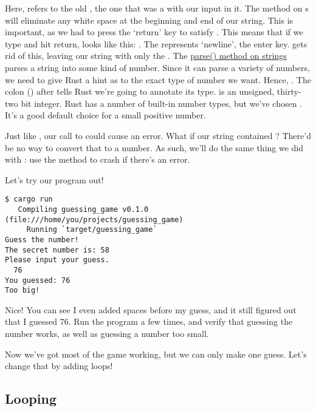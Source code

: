 Here,  refers to the old , the one that was a  with our input in it. The  method 
on s will eliminate any white space at the beginning and end of our string. This is important, as we had to press the
‘return’ key to satisfy . This means that if we type  and hit return,  looks like this: 
. The \code{\\n} represents ‘newline’, the enter key.  gets rid of this, leaving our string with only the 
. The \href{https://doc.rust-lang.org/std/primitive.str.html#method.parse}{parse() method on strings} parses a string into
some kind of number. Since it can parse a variety of numbers, we need to give Rust a hint as to the exact type of number we want.
Hence, . The colon (\code{:}) after  tells Rust we’re going to annotate its type.  is 
an unsigned, thirty-two bit integer. Rust has a number of built-in number types, but we’ve chosen . It’s a good default
choice for a small positive number.

\blank

Just like , our call to  could cause an error. What if our string contained ? 
There’d be no way to convert that to a number. As such, we’ll do the same thing we did with : use the 
 method to crash if there’s an error.

\blank

Let’s try our program out!

\begin{verbatim}
$ cargo run
   Compiling guessing_game v0.1.0 (file:///home/you/projects/guessing_game)
     Running `target/guessing_game`
Guess the number!
The secret number is: 58
Please input your guess.
  76
You guessed: 76
Too big!
\end{verbatim}

Nice! You can see I even added spaces before my guess, and it still figured out that I guessed 76. Run the program a few times, 
and verify that guessing the number works, as well as guessing a number too small.

\blank

Now we’ve got most of the game working, but we can only make one guess. Let’s change that by adding loops!

\subsection{Looping}

